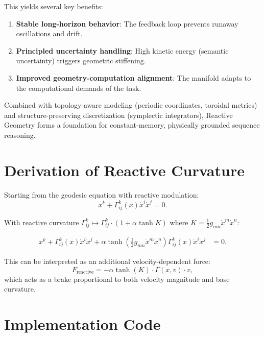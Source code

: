\documentclass[12pt,letterpaper,twoside]{article}
\begin{document}
This yields several key benefits:

\begin{enumerate}
\item \textbf{Stable long-horizon behavior}: The feedback loop prevents runaway oscillations and drift.
\item \textbf{Principled uncertainty handling}: High kinetic energy (semantic uncertainty) triggers geometric stiffening.
\item \textbf{Improved geometry-computation alignment}: The manifold adapts to the computational demands of the task.
\end{enumerate}

Combined with topology-aware modeling (periodic coordinates, toroidal metrics) and structure-preserving discretization (symplectic integrators), Reactive Geometry forms a foundation for constant-memory, physically grounded sequence reasoning.

\clearpage

\appendix

\section{Derivation of Reactive Curvature}

Starting from the geodesic equation with reactive modulation:
\[
\ddot{x}^k + \Gamma^k_{ij}(x) \dot{x}^i \dot{x}^j = 0.
\]

With reactive curvature $\Gamma^k_{ij} \mapsto \Gamma^k_{ij} \cdot (1 + \alpha \tanh K)$ where $K = \frac{1}{2}g_{mn}\dot{x}^m\dot{x}^n$:

\begin{align}
\ddot{x}^k + \Gamma^k_{ij}(x) \dot{x}^i \dot{x}^j 
    + \alpha \tanh\left(\frac{1}{2}g_{mn}\dot{x}^m\dot{x}^n\right) \Gamma^k_{ij}(x) \dot{x}^i \dot{x}^j &= 0.
\end{align}

This can be interpreted as an additional velocity-dependent force:
\[
F_{\text{reactive}} = -\alpha \tanh(K) \cdot \Gamma(x,v) \cdot v,
\]
which acts as a brake proportional to both velocity magnitude and base curvature.

\section{Implementation Code}
\end{document}

